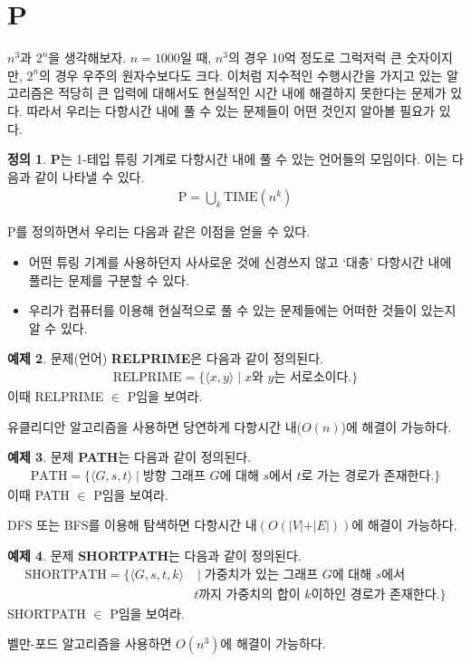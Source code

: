 \documentclass[b5paper, 11pt]{book}
\theoremstyle{definition}
\newtheorem{defn}{정의}[chapter]
\newtheorem{ex}[defn]{예제}
\newenvironment{pf*}{\pushQED{\qed}\pf}
{\popQED\endpf}
\begin{document}
\section{P}
$n^3$과 $2^n$을 생각해보자. $n=1000$일 때, $n^3$의 경우 10억 정도로 그럭저럭 큰 숫자이지만, $2^n$의 경우 우주의 원자수보다도 크다. 이처럼 지수적인 수행시간을 가지고 있는 알고리즘은 적당히 큰 입력에 대해서도 현실적인 시간 내에 해결하지 못한다는 문제가 있다. 따라서 우리는 다항시간 내에 풀 수 있는 문제들이 어떤 것인지 알아볼 필요가 있다.
\begin{defn}
    \textbf{P}는 1-테입 튜링 기계로 다항시간 내에 풀 수 있는 언어들의 모임이다. 이는 다음과 같이 나타낼 수 있다.
    \begin{align*}
        \text{P} = \bigcup_k \text{TIME}(n^k)
    \end{align*}
\end{defn} 
P를 정의하면서 우리는 다음과 같은 이점을 얻을 수 있다.
\begin{itemize}
    \item 어떤 튜링 기계를 사용하던지 사사로운 것에 신경쓰지 않고 `대충' 다항시간 내에 풀리는 문제를 구분할 수 있다.
    \item 우리가 컴퓨터를 이용해 현실적으로 풀 수 있는 문제들에는 어떠한 것들이 있는지 알 수 있다. 
\end{itemize}
\begin{ex}
    문제(언어) \textbf{RELPRIME}은 다음과 같이 정의된다. 
    \begin{align*}
        \text{RELPRIME} = \{\langle x,y \rangle  \;\vert\; x\text{와 } y\text{는 서로소이다.}\}
    \end{align*}
    이때 RELPRIME $\in $ P임을 보여라.  
\end{ex}
\begin{pf*}
    유클리디안 알고리즘을 사용하면 당연하게 다항시간 내($O(n)$)에 해결이 가능하다. 
\end{pf*}
\begin{ex}\label{PATH}
    문제 \textbf{PATH}는 다음과 같이 정의된다.
    \begin{align*}
        \text{PATH}= \{\langle G, s, t \rangle \;\vert\; \text{방향 그래프 } G\text{에 대해 }s \text{에서 }t\text{로 가는 경로가 존재한다.}\}
    \end{align*}
    이때 PATH $\in $ P임을 보여라.
\end{ex}
\begin{pf*}
    DFS 또는 BFS를 이용해 탐색하면 다항시간 내$(O(\vert V \vert + \vert E \vert))$에 해결이 가능하다. 
\end{pf*}
\begin{ex}
    문제 \textbf{SHORTPATH}는 다음과 같이 정의된다.
    \begin{align*}
        \text{SHORTPATH} = \{ \langle G,s, t, k \rangle & \;\vert\; \text{가중치가 있는 그래프 }
          G \text{에 대해 } s \text{에서 } \\ 
        & t \text{까지 가중치의 합이 } k \text{이하인 경로가 존재한다.} \}
    \end{align*}
    SHORTPATH $\in $ P임을 보여라.
\end{ex}
\begin{pf*}
    벨만-포드 알고리즘을 사용하면 $O(n^3)$에 해결이 가능하다.
\end{pf*}
\end{document}
